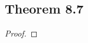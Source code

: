 \documentclass[../../main.tex]{subfiles}
\begin{document}
\subsection{Theorem 8.7}
\begin{wts}

\end{wts}
\begin{proof}

\end{proof}
\end{document}
